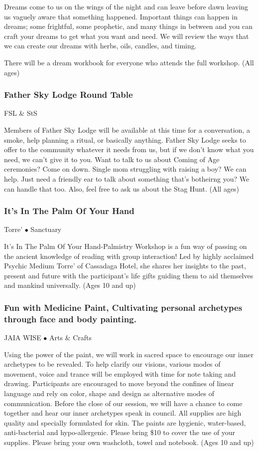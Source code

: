 Dreams come to us on the wings of the night and can leave before dawn leaving us vaguely aware that something happened.  Important things can happen in dreams; some frightful, some prophetic, and many things in between and you can craft your dreams to get what you want and need.  We will review the ways that we can create our dreams with herbs, oils, candles, and timing.

There will be a dream workbook for everyone who attends the full workshop. {\small (All ages)}

\subsubsection{Father Sky Lodge Round Table}
\label{Fri-Sage1}
{\small  FSL \& StS}

 Members of Father Sky Lodge will be available at this time for a conversation, a smoke, help planning a ritual, or basically anything. Father Sky Lodge seeks to offer to the community whatever it needs from us, but if we don't know what you need, we can't give it to you. Want to talk to us about Coming of Age ceremonies? Come on down. Single mom struggling with raising a boy? We can help. Just need a friendly ear to talk about something that's botheirng you? We can handle that too.  Also, feel free to ask us about the Stag Hunt. {\small (All ages)}

\subsubsection{It's In The Palm Of Your Hand}
\label{Fri-Torre1}
{\small Torre' $\bullet$  Sanctuary}

 It's In The Palm Of Your Hand-Palmistry Workshop is a fun way of passing on the ancient knowledge of reading with group interaction!
Led by highly acclaimed Psychic Medium Torre' of Cassadaga Hotel, she shares her insights to the past, present and future with the participant's life gifts guiding them to aid themselves and mankind universally. {\small (Ages 10 and up)}

\subsubsection{Fun with Medicine Paint, Cultivating  personal archetypes through face and body painting.}
\label{Fri-Wise1}
{\small JAIA WISE $\bullet$  Arts \& Crafts}

 Using the power of the paint, we will work in sacred space to encourage our inner archetypes to be revealed. To help clarify our visions, various modes of movement, voice and trance will be employed with time for note taking and drawing. Participants are encouraged to move beyond the confines of linear language and rely on color, shape and design as alternative modes of communication. Before the close of our session, we will have a chance to come together and hear our inner archetypes speak in council.
All supplies are high quality and specially formulated for skin. The paints are hygienic, water-based, anti-bacterial and hypo-allergenic. Please bring \$10 to cover the use of your supplies.
Please bring your own washcloth, towel and notebook. {\small (Ages 10 and up)}

